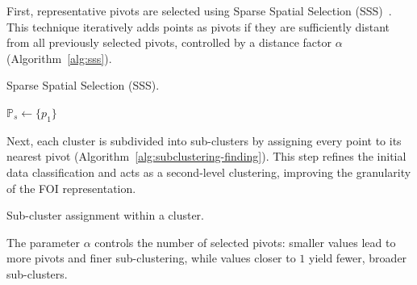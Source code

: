 First, representative pivots are selected using Sparse Spatial Selection (SSS)~\cite{pedreira2007}. This technique iteratively adds points as pivots if they are sufficiently distant from all previously selected pivots, controlled by a distance factor $\alpha$ (Algorithm~\ref{alg:sss}).

\begin{algorithm}
    \caption{Sparse Spatial Selection (SSS).}
    \label{alg:sss}
    $\mathbb{P}_s \gets \{p_1\}$ \\
\end{algorithm}

Next, each cluster is subdivided into sub-clusters by assigning every point to its nearest pivot (Algorithm~\ref{alg:subclustering-finding}). This step refines the initial data classification and acts as a second-level clustering, improving the granularity of the FOI representation.

\begin{algorithm}
    \caption{Sub-cluster assignment within a cluster.}
    \label{alg:subclustering-finding}
\end{algorithm}

The parameter $\alpha$ controls the number of selected pivots: smaller values lead to more pivots and finer sub-clustering, while values closer to $1$ yield fewer, broader sub-clusters.

